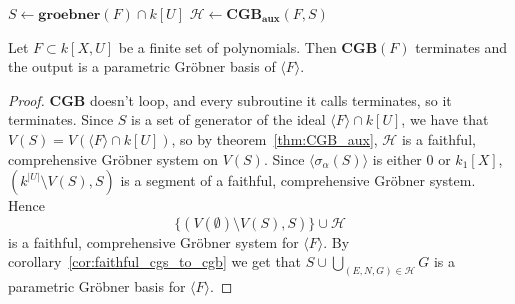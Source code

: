 \documentclass[a4paper, 12pt]{article}
\theoremstyle{changedot}
\theoremstyle{changedotbreak}
\theoremstyle{nonumberplain}
\newtheorem{proof}{Proof}
\begin{document}
\begin{algorithm}
  \caption{$\mathbf{CGB}$}
  $S \gets \mathbf{groebner}(F) \cap k[U]$\;
  $\mathcal H \gets \mathbf{CGB_{aux}}(F, S)$\;
  \;
\end{algorithm}
\begin{theorem}
  Let $F \subset k[X, U]$ be a finite set of polynomials. Then $\mathbf{CGB}(F)$ terminates and the output is a parametric Gröbner basis of $\langle F \rangle$.
\end{theorem}
\begin{proof}
  $\mathbf{CGB}$ doesn't loop, and every subroutine it calls terminates, so it terminates. Since $S$ is a set of generator of the ideal $\langle F \rangle \cap k[U]$, we have that $V(S) = V(\langle F \rangle \cap k[U])$, so by theorem~\ref{thm:CGB_aux}, $\mathcal H$ is a faithful, comprehensive Gröbner system on $V(S)$. Since $\langle \sigma_{\alpha}(S) \rangle$ is either 0 or $k_{1}[X]$, $(k^{|U|} \setminus V(S), S)$ is a segment of a faithful, comprehensive Gröbner system. Hence \[\{(V(\emptyset) \setminus V(S), S)\} \cup \mathcal H\] is a faithful, comprehensive Gröbner system for $\langle F \rangle$. By corollary~\ref{cor:faithful_cgs_to_cgb} we get that $S \cup \bigcup_{(E, N, G) \in \mathcal H} G$ is a parametric Gröbner basis for $\langle F \rangle$.
\end{proof}

















































\printbibliography


\appendix


\end{document}
